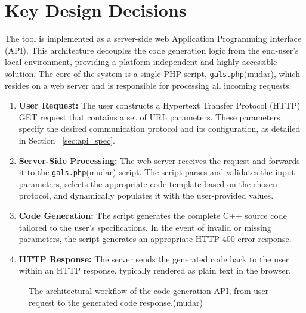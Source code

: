 
\section{Key Design Decisions}
\label{sec:design_decisions}

The tool is implemented as a server-side web Application Programming Interface (API). This architecture decouples the code generation logic from the end-user's local environment, providing a platform-independent and highly accessible solution. The core of the system is a single PHP script, \texttt{gals.php}(mudar), which resides on a web server and is responsible for processing all incoming requests.



\begin{enumerate}
    \item \textbf{User Request:} The user constructs a Hypertext Transfer Protocol (HTTP) GET request that contains a set of URL parameters. These parameters specify the desired communication protocol and its configuration, as detailed in Section ~\ref{sec:api_spec}.
    \item \textbf{Server-Side Processing:} The web server receives the request and forwards it to the \texttt{gals.php}(mudar) script. The script parses and validates the input parameters, selects the appropriate code template based on the chosen protocol, and dynamically populates it with the user-provided values.
    \item \textbf{Code Generation:} The script generates the complete C++ source code tailored to the user's specifications. In the event of invalid or missing parameters, the script generates an appropriate HTTP 400 error response.
    \item \textbf{HTTP Response:} The server sends the generated code back to the user within an HTTP response, typically rendered as plain text in the browser.
\end{enumerate}

\begin{figure}[h!]
    \centering
    
    \caption{The architectural workflow of the code generation API, from user request to the generated code response.(mudar)}
    \label{fig:api_workflow}
\end{figure}

